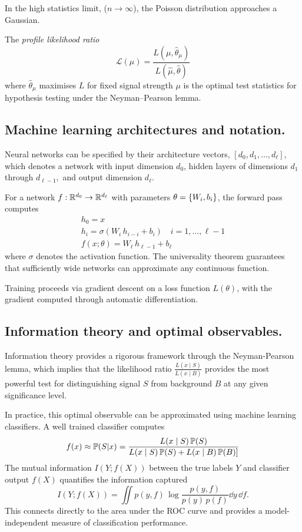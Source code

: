     In the high statistics limit, (\(n \to\infty\)), the Poisson distribution approaches a Gaussian.
    
    \begin{definition}
        The \emph{profile likelihood ratio}
            \[
                \mathcal L(\mu) = \frac{L(\mu, \hat\theta_\mu)}{ L(\hat\mu, \hat\theta)}
            \]
            where \(\hat\theta_\mu\) maximises \(L\) for fixed signal strength \(\mu\) is the optimal test statistics for hypothesis testing under the Neyman--Pearson lemma.

    \subsection{Machine learning architectures and notation.}
        Neural networks can be specified by their architecture vectors, \( [d_0, d_1,\dots, d_\ell]\), which denotes a network with input dimension \(d_0\), hidden layers of dimensions \(d_1\) through \(d_{\ell-1},\) and output dimension \(d_\ell\).

        For a network \(f: \R^{d_0} \to\R^{d_{\ell}}\) with parameters \(\theta = \qty{W_i, b_i}\), the forward pass computes
        \begin{gather}
            h_0 = x\\
            h_i = \sigma(W_i\,h_{i-i} + b_i)\quad i = 1,\dots, \ell-1\\
            f(x;\theta) = W_\ell\,h_{\ell - 1} + b_\ell
        \end{gather}
        where \(\sigma\) denotes the activation function. The universality theorem guarantees that sufficiently wide networks can approximate any continuous function.

        Training proceeds via gradient descent on a loss function \(L(\theta)\), with the gradient computed through automatic differentiation.
        
    \subsection{Information theory and optimal observables.}
        Information theory provides a rigorous framework through the Neyman-Pearson lemma, which implies that the likelihood ratio \(\frac{L(x\mid S)}{L(x\mid B)}\) provides the most powerful test for distinguishing signal \(S\) from background \(B\) at any given significance level.

        In practice, this optimal observable can be approximated using machine learning classifiers.
        A well trained classifier computes
        \[
            f(x) \approx \P(S|x) = \frac{L(x\mid S)\,\P(S)}{L(x\mid S)\,\P(S) + L(x\mid B)\, \P(B)]}
        \]
        The mutual information \(I(Y; f(X))\) between the true labels \(Y\) and classifier output \(f(X)\) quantifies the information captured
        \[
            I(Y; f(X)) = \iint p(y, f)\,\log \frac{p(y, f)}{p(y)\,p(f)} \dd y\, \dd f.
        \]
        This connects directly to the area under the ROC curve and provides a model-independent measure of classification performance.


\end{definition}
